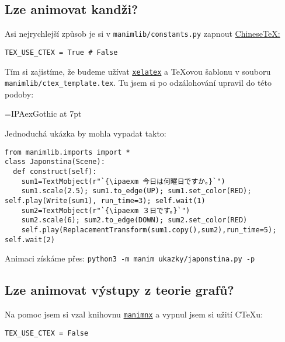 \subsection{Lze animovat kandži?}
Asi nejrychlejší způsob je si v \texttt{manimlib/constants.py} zapnout 
\href{https://ctan.org/pkg/ctex}{Chinese\TeX:}
\begin{lstlisting}
TEX_USE_CTEX = True # False
\end{lstlisting}

Tím si zajistíme, že budeme užívat 
\href{https://www.ctan.org/pkg/xetex}{\texttt{xelatex}} a \TeX ovou šablonu v souboru \texttt{manimlib/ctex\_template.tex}. Tu jsem si po odzálohování upravil do této podoby:

\noindent
\begin{minipage}{\linewidth}

\end{minipage}

\font\ipaexm=IPAexGothic at 7pt %

Jednoduchá ukázka by mohla vypadat takto:
%

\noindent
\begin{minipage}{\linewidth}
\begin{lstlisting}[escapeinside=``]
from manimlib.imports import *
class Japonstina(Scene):
  def construct(self):
    sum1=TextMobject(r"`{\ipaexm 今日は何曜日ですか。}`")
    sum1.scale(2.5); sum1.to_edge(UP); sum1.set_color(RED); self.play(Write(sum1), run_time=3); self.wait(1)
    sum2=TextMobject(r"`{\ipaexm ３日です。}`")
    sum2.scale(6); sum2.to_edge(DOWN); sum2.set_color(RED)
    self.play(ReplacementTransform(sum1.copy(),sum2),run_time=5); self.wait(2)
\end{lstlisting}
\end{minipage}

Animaci získáme přes: \texttt{python3 -m manim ukazky/japonstina.py -p}
\smallskip

\maldelka=10mm
\noindent
{}\hfill
\smallskip

\noindent
{}\hfill
{}%


\subsection{Lze animovat výstupy z teorie grafů?}
Na pomoc jsem si vzal knihovnu \href{https://github.com/rajatvd/manimnx}{\texttt{manimnx}} a vypnul jsem si užití C\TeX u:
\begin{lstlisting}
TEX_USE_CTEX = False
\end{lstlisting}

